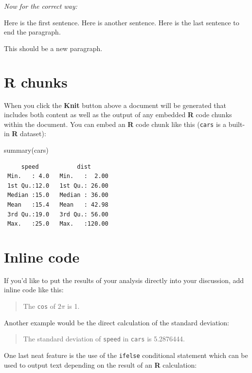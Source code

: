 \documentclass[
  letterpaper,
  12pt,
  twoside]{book}
\newenvironment{Shaded}{\begin{snugshade}}{\end{snugshade}}
\newcommand{\FunctionTok}[1]{\textcolor[rgb]{0.28,0.35,0.67}{#1}}
\newcommand{\NormalTok}[1]{\textcolor[rgb]{0.00,0.23,0.31}{#1}}
\begin{document}
\emph{Now for the correct way:}

Here is the first sentence. Here is another sentence. Here is the last
sentence to end the paragraph.

This should be a new paragraph.

\section{R chunks}\label{r-chunks}

When you click the \textbf{Knit} button above a document will be
generated that includes both content as well as the output of any
embedded \textbf{R} code chunks within the document. You can embed an
\textbf{R} code chunk like this (\texttt{cars} is a built-in \textbf{R}
dataset):

\begin{Shaded}
\begin{Highlighting}[]
\FunctionTok{summary}\NormalTok{(cars)}
\end{Highlighting}
\end{Shaded}

\begin{verbatim}
     speed           dist       
 Min.   : 4.0   Min.   :  2.00  
 1st Qu.:12.0   1st Qu.: 26.00  
 Median :15.0   Median : 36.00  
 Mean   :15.4   Mean   : 42.98  
 3rd Qu.:19.0   3rd Qu.: 56.00  
 Max.   :25.0   Max.   :120.00  
\end{verbatim}

\section{Inline code}\label{inline-code}

If you'd like to put the results of your analysis directly into your
discussion, add inline code like this:

\begin{quote}
The \texttt{cos} of \(2 \pi\) is 1.
\end{quote}

Another example would be the direct calculation of the standard
deviation:

\begin{quote}
The standard deviation of \texttt{speed} in \texttt{cars} is 5.2876444.
\end{quote}

One last neat feature is the use of the \texttt{ifelse} conditional
statement which can be used to output text depending on the result of an
\textbf{R} calculation:
\end{document}
